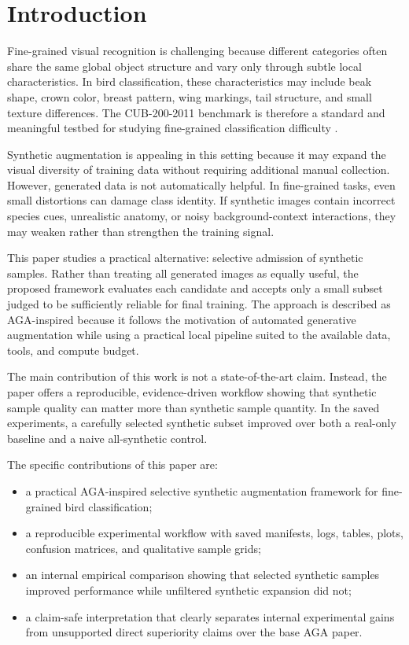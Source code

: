 \documentclass[conference]{IEEEtran}
\begin{document}
\section{Introduction}
Fine-grained visual recognition is challenging because different categories often share the same global object structure and vary only through subtle local characteristics. In bird classification, these characteristics may include beak shape, crown color, breast pattern, wing markings, tail structure, and small texture differences. The CUB-200-2011 benchmark is therefore a standard and meaningful testbed for studying fine-grained classification difficulty \cite{wah2011}.

Synthetic augmentation is appealing in this setting because it may expand the visual diversity of training data without requiring additional manual collection. However, generated data is not automatically helpful. In fine-grained tasks, even small distortions can damage class identity. If synthetic images contain incorrect species cues, unrealistic anatomy, or noisy background-context interactions, they may weaken rather than strengthen the training signal.

This paper studies a practical alternative: selective admission of synthetic samples. Rather than treating all generated images as equally useful, the proposed framework evaluates each candidate and accepts only a small subset judged to be sufficiently reliable for final training. The approach is described as AGA-inspired because it follows the motivation of automated generative augmentation while using a practical local pipeline suited to the available data, tools, and compute budget.

The main contribution of this work is not a state-of-the-art claim. Instead, the paper offers a reproducible, evidence-driven workflow showing that synthetic sample quality can matter more than synthetic sample quantity. In the saved experiments, a carefully selected synthetic subset improved over both a real-only baseline and a naive all-synthetic control.

The specific contributions of this paper are:
\begin{itemize}
    \item a practical AGA-inspired selective synthetic augmentation framework for fine-grained bird classification;
    \item a reproducible experimental workflow with saved manifests, logs, tables, plots, confusion matrices, and qualitative sample grids;
    \item an internal empirical comparison showing that selected synthetic samples improved performance while unfiltered synthetic expansion did not;
    \item a claim-safe interpretation that clearly separates internal experimental gains from unsupported direct superiority claims over the base AGA paper.
\end{itemize}
\end{document}
